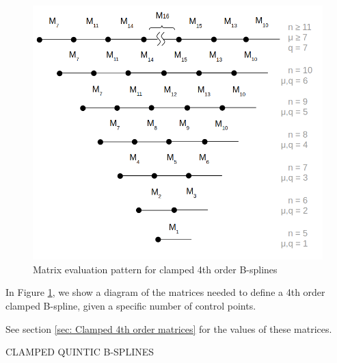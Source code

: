 \documentclass{article}
\begin{document}
\begin{figure}[H]
\begin{center}
\includegraphics[scale=.37]{Clamped4thOrderMatrixPattern.png}
\end{center}
\caption{Matrix evaluation pattern for clamped 4th order B-splines}
\label{Fig:Clamped 4th Order}
\end{figure}

    In Figure \ref{Fig:Clamped 4th Order}, we show a diagram of the matrices needed to define a 4th order clamped B-spline, given a specific number of control points.

See section \ref{sec: Clamped 4th order matrices} for the values of these matrices.

\hspace{1cm}

\hspace{1cm}

\noindent CLAMPED QUINTIC B-SPLINES
\hfill \break

\hspace{1cm}
\end{document}
